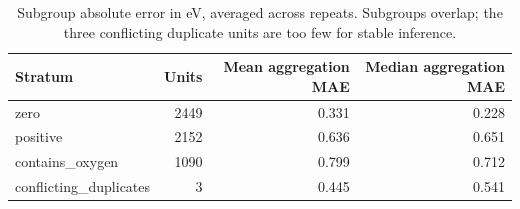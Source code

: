\begin{table}[htbp]\centering\small
\caption{Subgroup absolute error in eV, averaged across repeats. Subgroups overlap; the three conflicting duplicate units are too few for stable inference.}
\begin{tabular}{lrrr}
\toprule
Stratum & Units & Mean aggregation MAE & Median aggregation MAE \\
\midrule
zero & 2449 & 0.331 & 0.228 \\
positive & 2152 & 0.636 & 0.651 \\
contains\_oxygen & 1090 & 0.799 & 0.712 \\
conflicting\_duplicates & 3 & 0.445 & 0.541 \\
\bottomrule
\end{tabular}\end{table}
